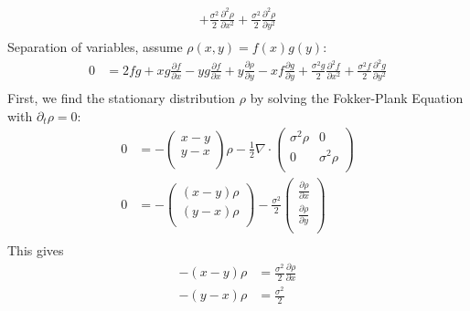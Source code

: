 \documentclass[12pt]{article}
\theoremstyle{plain}
\theoremstyle{definition}
\theoremstyle{remark}
\begin{document}
\begin{enumerate}
\begin{enumerate}
\begin{align*}
          + \frac{\sigma^2 }{2} \frac{\partial^2 \rho}{\partial x^2}
          + \frac{\sigma^2 }{2} \frac{\partial^2 \rho}{\partial y^2}\\
        \end{align*}
        Separation of variables, assume $\rho(x,y) = f(x) g(y)$:
        \begin{align*}
          0 &=
          2fg + xg\frac{\partial f}{\partial x}
          -yg\frac{\partial f}{\partial x}
          + y\frac{\partial\rho}{\partial y}
          -xf\frac{\partial g}{\partial y}
          + \frac{\sigma^2 g}{2} \frac{\partial^2 f}{\partial x^2}
          + \frac{\sigma^2 f}{2} \frac{\partial^2 g}{\partial y^2}\\
        \end{align*}
        First, we find the stationary distribution $\rho$ by solving the
        Fokker-Plank Equation with $\partial_t \rho=0$:
        \begin{align*}
          0 &=
          -\begin{pmatrix}
            x-y\\
            y-x\\
          \end{pmatrix}\rho
          - \frac{1}{2} \nabla \cdot
          \begin{pmatrix}
            \sigma^2 \rho & 0 \\
            0 & \sigma^2 \rho\\
          \end{pmatrix}
          \\
          0&=
          -\begin{pmatrix}
            (x-y)\rho\\
            (y-x)\rho\\
          \end{pmatrix}
          - \frac{\sigma^2 }{2}
          \begin{pmatrix}
            \frac{\partial \rho}{\partial x} \\
            \frac{\partial \rho}{\partial y} \\
          \end{pmatrix}
          \\
        \end{align*}
        This gives
        \begin{align*}
          -(x-y)\rho &= \frac{\sigma^2 }{2}
            \frac{\partial \rho}{\partial x} \\
          -(y-x)\rho &= \frac{\sigma^2 }{2}

\end{align*}
\end{enumerate}
\end{enumerate}
\end{document}
